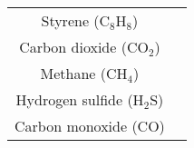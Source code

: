 \begin{table}[]
\begin{tabular}{@{}cc@{}}
Styrene (C$_8$H$_8$)      &                                                                  \\
Carbon dioxide (CO$_2$)       &                                                                  \\
Methane (CH$_4$)   &                                                                  \\
Hydrogen sulfide (H$_2$S)          &                                                                  \\
Carbon monoxide (CO)       &                                                                  \\ \bottomrule
\end{tabular}
\end{table}